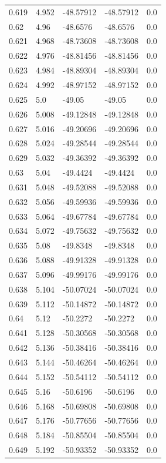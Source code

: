 \begin{tabular}{lllll}
0.619 & 4.952 & -48.57912 & -48.57912 & 0.0 \\
0.62 & 4.96 & -48.6576 & -48.6576 & 0.0 \\
0.621 & 4.968 & -48.73608 & -48.73608 & 0.0 \\
0.622 & 4.976 & -48.81456 & -48.81456 & 0.0 \\
0.623 & 4.984 & -48.89304 & -48.89304 & 0.0 \\
0.624 & 4.992 & -48.97152 & -48.97152 & 0.0 \\
0.625 & 5.0 & -49.05 & -49.05 & 0.0 \\
0.626 & 5.008 & -49.12848 & -49.12848 & 0.0 \\
0.627 & 5.016 & -49.20696 & -49.20696 & 0.0 \\
0.628 & 5.024 & -49.28544 & -49.28544 & 0.0 \\
0.629 & 5.032 & -49.36392 & -49.36392 & 0.0 \\
0.63 & 5.04 & -49.4424 & -49.4424 & 0.0 \\
0.631 & 5.048 & -49.52088 & -49.52088 & 0.0 \\
0.632 & 5.056 & -49.59936 & -49.59936 & 0.0 \\
0.633 & 5.064 & -49.67784 & -49.67784 & 0.0 \\
0.634 & 5.072 & -49.75632 & -49.75632 & 0.0 \\
0.635 & 5.08 & -49.8348 & -49.8348 & 0.0 \\
0.636 & 5.088 & -49.91328 & -49.91328 & 0.0 \\
0.637 & 5.096 & -49.99176 & -49.99176 & 0.0 \\
0.638 & 5.104 & -50.07024 & -50.07024 & 0.0 \\
0.639 & 5.112 & -50.14872 & -50.14872 & 0.0 \\
0.64 & 5.12 & -50.2272 & -50.2272 & 0.0 \\
0.641 & 5.128 & -50.30568 & -50.30568 & 0.0 \\
0.642 & 5.136 & -50.38416 & -50.38416 & 0.0 \\
0.643 & 5.144 & -50.46264 & -50.46264 & 0.0 \\
0.644 & 5.152 & -50.54112 & -50.54112 & 0.0 \\
0.645 & 5.16 & -50.6196 & -50.6196 & 0.0 \\
0.646 & 5.168 & -50.69808 & -50.69808 & 0.0 \\
0.647 & 5.176 & -50.77656 & -50.77656 & 0.0 \\
0.648 & 5.184 & -50.85504 & -50.85504 & 0.0 \\
0.649 & 5.192 & -50.93352 & -50.93352 & 0.0 \\

\end{tabular}
